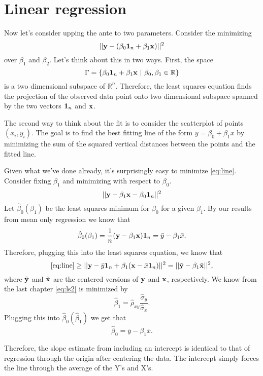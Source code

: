 \chapter{Linear regression}

Now let's consider upping the ante to two parameters. Consider the minimizing
\begin{equation}
\label{eq:line}
|| \mathbf{y} - (\beta_0 \mathbf{1}_n + \beta_1 \mathbf{x}) ||^2
\end{equation}
over $\beta_1$ and $\beta_2$. Let's think about this in two ways. 
First, the space $$\Gamma = \{\beta_0 \mathbf{1}_n + \beta_1 \mathbf{x} ~|~ \beta_0, \beta_1 \in \mathbb{R}\}$$
is a two dimensional subspace of $\mathbb{R}^n$. Therefore, the least squares
equation finds the projection of the observed data point 
onto two dimensional subspace spanned by the two vectors $\mathbf{1}_n$ and $\mathbf{x}$.

The second way to think about the fit is to consider the scatterplot
of points $(x_i, y_i)$. The goal is to find the best fitting line
of the form $y = \beta_0 + \beta_1 x$ by minimizing the sum of the
squared vertical distances between the points and the fitted line. 

Given what we've done already, it's surprisingly easy to minimize
\eqref{eq:line}. Consider fixing $\beta_1$ and minimizing
with respect to $\beta_0$.
$$
|| \mathbf{y} - \beta_1 \mathbf{x}  - \beta_0 \mathbf{1}_n ||^2
$$
Let $\hat \beta_0 (\beta_1)$ be the least squares minimum for $\beta_0$
for a given $\beta_1$. 
By our results from mean only regression we know that
\begin{equation*}
\label{eq:intercept}
\hat \beta_0 (\beta_1) = \frac{1}{n}(\mathbf{y} - \beta_1 \mathbf{x}) \mathbf{1}_n = \bar y - \beta_1 \bar x.
\end{equation*}
Therefore, plugging this into the least squares equation, we know that
\begin{equation}
\label{eq:ls2}
\eqref{eq:line} \geq 
|| \mathbf{y} -  \bar y \mathbf{1}_n + \beta_1 (\mathbf{x}  - \bar x \mathbf{1}_n) ||^2= || \tilde {\mathbf{y}} - \beta_1 \tilde {\mathbf{x}}||^2,
\end{equation}
where $\tilde {\mathbf{y}}$ and $\tilde {\mathbf{x}}$ are the centered versions of $\mathbf{y}$ and
$\mathbf{x}$, respectively. We know from the last chapter \eqref{eq:ls2} is minimized 
by 
$$\hat \beta_1 = \hat \rho_{xy} \frac{\hat \sigma_y}{\hat \sigma_x}.$$
Plugging this into $\hat \beta_0(\hat \beta_1)$ we get that
$$
\hat \beta_0 = \bar y - \beta_1 \bar x.
$$

Therefore, the slope estimate from including an intercept is identical to that of
regression through  the origin after centering the data. The intercept simply
forces the line through the average of the Y's and X's.

